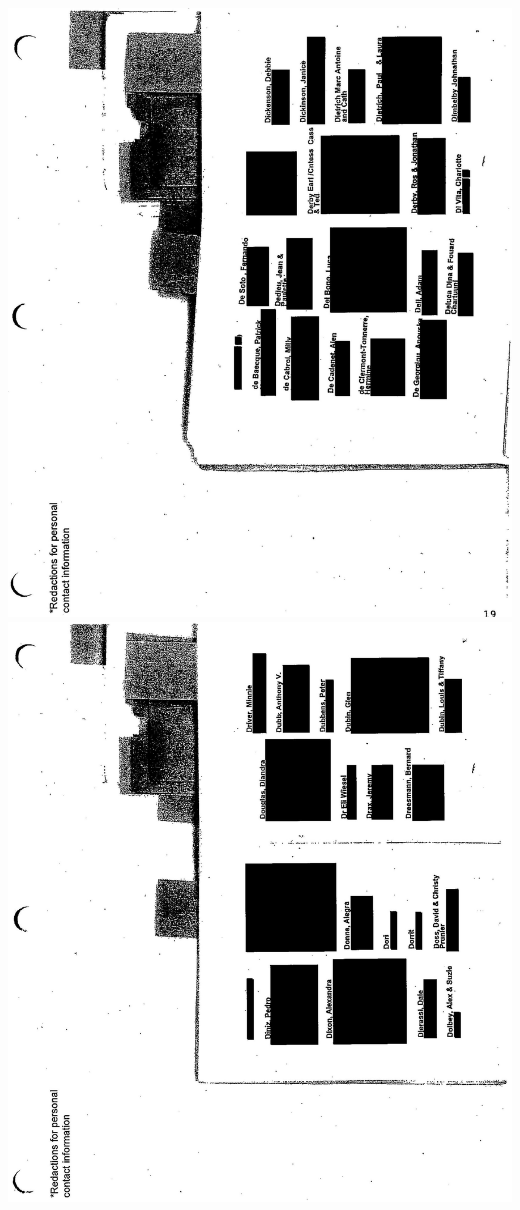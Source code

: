 \documentclass[10pt]{article}
\begin{document}
\includegraphics[max width=\textwidth, center]{2025_02_27_dd68c3d38de88f0516d9g-136}\\
\includegraphics[max width=\textwidth, center]{2025_02_27_dd68c3d38de88f0516d9g-137}\\
\end{document}
